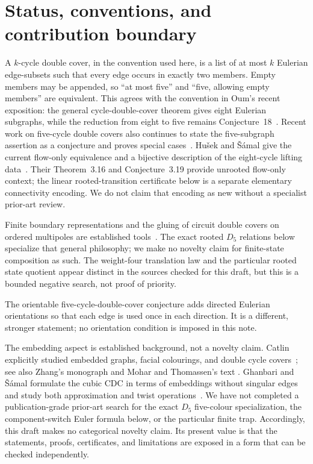 \documentclass[11pt]{article}
\theoremstyle{definition}
\theoremstyle{remark}
\begin{document}
\section{Status, conventions, and contribution boundary}

A \(k\)-cycle double cover, in the convention used here, is a list of at
most \(k\) Eulerian edge-subsets such that every edge occurs in exactly two
members.  Empty members may be appended, so ``at most five'' and ``five,
allowing empty members'' are equivalent.  This agrees with the convention
in Oum's recent exposition: the general cycle-double-cover theorem gives
eight Eulerian subgraphs, while the reduction from eight to five remains
Conjecture~18~\cite{Oum2026}.  Recent work on five-cycle double covers also
continues to state the five-subgraph assertion as a conjecture and proves
special cases~\cite{LiuEtAl2023,LiuEtAl2025}.  Hu\v{s}ek and
\v{S}\'amal give the current flow-only equivalence and a bijective
description of the eight-cycle lifting data~\cite{HusekSamal2026}.  Their
Theorem~3.16 and Conjecture~3.19 provide unrooted flow-only context; the
linear rooted-transition certificate below is a separate elementary
connectivity encoding.  We do not claim that encoding as new without a
specialist prior-art review.

Finite boundary representations and the gluing of circuit double covers on
ordered multipoles are established tools~\cite{HusekSamal2025}.  The exact
rooted \(D_5\) relations below specialize that general philosophy; we make
no novelty claim for finite-state composition as such.  The weight-four
translation law and the particular rooted state quotient appear distinct
in the sources checked for this draft, but this is a bounded negative
search, not proof of priority.

The orientable five-cycle-double-cover conjecture adds directed Eulerian
orientations so that each edge is used once in each direction.  It is a
different, stronger statement; no orientation condition is imposed in
this note.

The embedding aspect is established background, not a novelty claim.
Catlin explicitly studied embedded graphs, facial colourings, and double
cycle covers~\cite{Catlin1990}; see also Zhang's monograph
\cite{Zhang2012} and Mohar and Thomassen's text
\cite{MoharThomassen2001}.  Ghanbari and \v{S}\'amal formulate the cubic
CDC in terms of embeddings without singular edges and study both
approximation and twist operations~\cite{GhanbariSamal2025,
GhanbariSamal2026}.  We have not completed a publication-grade prior-art
search for the exact \(D_5\) five-colour specialization, the
component-switch Euler formula below, or the particular finite trap.
Accordingly, this draft makes no categorical novelty claim.  Its present
value is that the statements, proofs, certificates, and limitations are
exposed in a form that can be checked independently.
\end{document}
